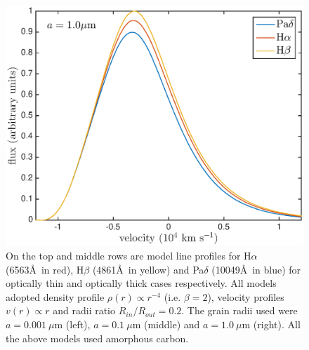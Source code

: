 \documentclass[useAMS,usenatbib,usegraphicx]{mnras}
\begin{document}
\begin{figure}
\includegraphics[trim =48 10 45 15,clip=true,scale=0.35]{a1_opt_thick_HaHbPad}
\caption{On the top and middle rows are model line profiles for H$\alpha$ (6563\AA\ in red), H$\beta$ (4861\AA\ in yellow) and Pa$\delta$ (10049\AA\ in blue) for optically thin and  optically thick cases respectively.  All models adopted density profile $\rho(r) \propto r^{-4}$ (i.e. $\beta = 2$), velocity profiles $v(r) \propto r$ and radii ratio $R_{in}/R_{out}=0.2$.  The grain radii used were $a=0.001~\mu$m (left), $a=0.1~\mu$m (middle) and $a=1.0~\mu$m (right). All the above models used amorphous carbon.}
\label{wav_dep}
\end{figure}
\end{document}
